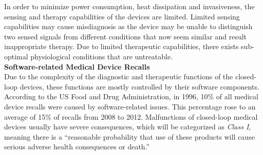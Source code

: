 In order to minimize power consumption, heat dissipation and invasiveness, the sensing and therapy capabilities of the devices are limited. Limited sensing capabilities may cause misdiagnosis as the device may be unable to distinguish two sensed signals from different conditions that now seem similar and result inappropriate therapy. Due to limited therapeutic capabilities, there exists sub-optimal physiological conditions that are untreatable. \\
\textbf{Software-related Medical Device Recalls}\\
Due to the complexity of the diagnostic and therapeutic functions of the closed-loop devices, these functions are mostly controlled by their software components. 
According to the US Food and Drug Administration, in 1996, 10\% of all medical device recalls were caused by software-related issues. This percentage rose to an average of 15\% of recalls from 2008 to 2012. Malfunctions of closed-loop medical devices usually have severe consequences, which will be categorized as \emph{Class I}, meaning there is a ``reasonable probability that use of these products will cause serious adverse health consequences or death.'' 
